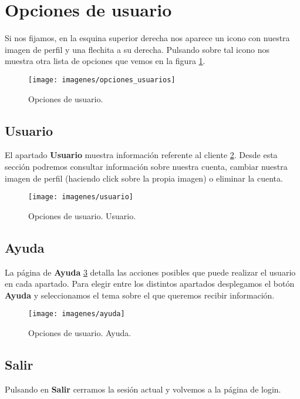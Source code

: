 \section{Opciones de usuario}
Si nos fijamos, en la esquina superior derecha nos aparece un icono con nuestra imagen de perfil y una flechita a su derecha. Pulsando sobre tal icono nos muestra otra lista de opciones que vemos en la figura \ref{fig:opciones_usuarios}.

\begin{figure}[H]
	\centering
	\texttt{[image: imagenes/opciones\_usuarios]}
	\caption{Opciones de usuario.}
	\label{fig:opciones_usuarios}
\end{figure}

\subsection{Usuario}
El apartado \textbf{Usuario} muestra información referente al cliente \ref{fig:usuario}. Desde esta sección podremos consultar información sobre nuestra cuenta, cambiar nuestra imagen de perfil (haciendo click sobre la propia imagen) o eliminar la cuenta.

\begin{figure}[H]
	\centering
	\texttt{[image: imagenes/usuario]}
	\caption{Opciones de usuario. Usuario.}
	\label{fig:usuario}
\end{figure}

\subsection{Ayuda}
La página de \textbf{Ayuda} \ref{fig:ayuda} detalla las acciones posibles que puede realizar el usuario en cada apartado. Para elegir entre los distintos apartados desplegamos el botón \textbf{Ayuda} y seleccionamos el tema sobre el que queremos recibir información.

\begin{figure}[H]
	\centering
	\texttt{[image: imagenes/ayuda]}
	\caption{Opciones de usuario. Ayuda.}
	\label{fig:ayuda}
\end{figure}

\subsection{Salir}
Pulsando en \textbf{Salir} cerramos la sesión actual y volvemos a la página de login.